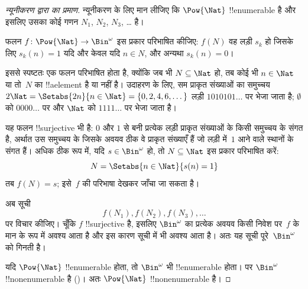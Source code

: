 \documentclass[../../../include/open-logic-section]{subfiles}
\begin{document}
\begin{proof}[न्यूनीकरण द्वारा {} का प्रमाण]
न्यूनीकरण के लिए मान लीजिए कि $\Pow{\Nat}$ !!{enumerable} है और इसलिए उसका
कोई गणन $N_{1}$, $N_{2}$, $N_{3}$, \dots{} है।

फलन $f \colon \Pow{\Nat} \to \Bin^\omega$ इस प्रकार परिभाषित कीजिए:
$f(N)$ वह लड़ी $s_{k}$ हो जिसके लिए $s_{k}(n) = 1$ यदि और केवल यदि
$n \in N$, और अन्यथा $s_k(n) = 0$।

इससे स्पष्टतः एक फलन परिभाषित होता है, क्योंकि जब भी $N \subseteq \Nat$
हो, तब कोई भी $n \in \Nat$ या तो~$N$ का !!a{element} है या नहीं है। उदाहरण
के लिए, सम प्राकृत संख्याओं का समुच्चय $2\Nat = \Setabs{2n}{n \in \Nat} = \{0,2, 4, 6,
\dots\}$ लड़ी $1010101\dots$ पर भेजा जाता है; $\emptyset$
को $0000\dots$ पर और $\Nat$ को $1111\dots$ पर भेजा जाता है।

यह फलन !!{surjective} भी है: $0$ और $1$ से बनी प्रत्येक लड़ी प्राकृत संख्याओं
के किसी समुच्चय के संगत है, अर्थात उस समुच्चय के जिसके अवयव ठीक वे प्राकृत
संख्याएँ हैं जो लड़ी में~$1$ आने वाले स्थानों के संगत हैं। अधिक ठीक रूप में,
यदि $s \in \Bin^\omega$ हो, तो $N
\subseteq \Nat$ इस प्रकार परिभाषित करें:
\[
N = \Setabs{n \in \Nat}{s(n) = 1}
\]
तब $f(N) = s$; इसे~$f$ की परिभाषा देखकर जाँचा जा सकता है।

अब सूची
\[
f(N_1), f(N_2), f(N_3), \dots
\]
पर विचार कीजिए। चूँकि $f$ !!{surjective} है, इसलिए $\Bin^\omega$ का प्रत्येक
अवयव किसी निवेश पर~$f$ के मान के रूप में अवश्य आता है और इस कारण सूची में भी
अवश्य आता है। अतः यह सूची पूरे~$\Bin^\omega$ को गिनती है।

यदि $\Pow{\Nat}$ !!{enumerable} होता, तो $\Bin^\omega$ भी !!{enumerable}
होता। पर $\Bin^\omega$ !!{nonenumerable} है
()। अतः $\Pow{\Nat}$
!!{nonenumerable} है।
\end{proof}

\end{document}
